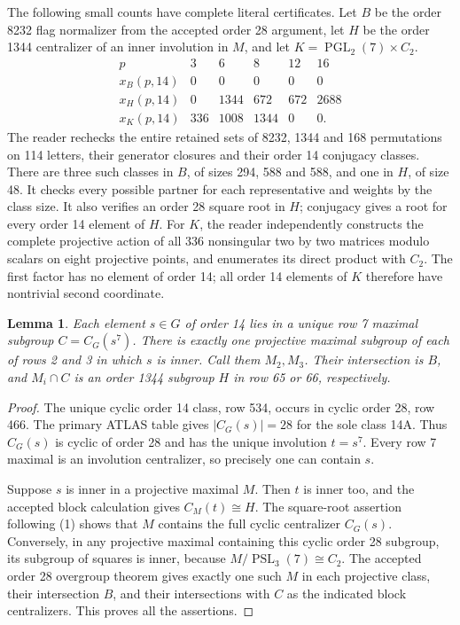 \documentclass[11pt,a4paper]{article}
\newtheorem{lemma}{Lemma}\newtheorem{theorem}{Theorem}
\begin{document}
The following small counts have complete literal certificates.
Let $B$ be the order 8232 flag normalizer from the accepted order 28
argument, let $H$ be the order 1344 centralizer of an inner involution
in $M$, and let $K=\operatorname{PGL}_2(7)\times C_2$.
\[
\begin{array}{c|rrrrr}
p&3&6&8&12&16\\\hline
x_B(p,14)&0&0&0&0&0\\
x_H(p,14)&0&1344&672&672&2688\\
x_K(p,14)&336&1008&1344&0&0.
\end{array}                                                    \tag{1}
\]
The reader rechecks the entire retained sets of 8232, 1344 and 168
permutations on 114 letters, their generator closures and their
order 14 conjugacy classes. There are three such classes in $B$,
of sizes 294, 588 and 588, and one in $H$, of size 48. It checks
every possible partner for each representative and weights by the
class size. It also verifies an order 28 square root in $H$;
conjugacy gives a root for every order 14 element of $H$.
For $K$, the reader independently constructs the complete projective
action of all 336 nonsingular two by two matrices modulo scalars
on eight projective points, and enumerates its direct product with
$C_2$. The first factor has no element of order 14; all order 14
elements of $K$ therefore have nontrivial second coordinate.

\begin{lemma}\label{inner}
Each element $s\in G$ of order 14 lies in a unique row 7 maximal
subgroup $C=C_G(s^7)$. There is exactly one projective maximal
subgroup of each of rows 2 and 3 in which $s$ is inner. Call them
$M_2,M_3$. Their intersection is $B$, and
$M_i\cap C$ is an order 1344 subgroup $H$ in row 65 or 66,
respectively.
\end{lemma}
\begin{proof}
The unique cyclic order 14 class, row 534, occurs in cyclic order
28, row 466. The primary ATLAS table gives $|C_G(s)|=28$ for the
sole class 14A. Thus $C_G(s)$ is cyclic of order 28 and has the
unique involution $t=s^7$. Every row 7 maximal is an involution
centralizer, so precisely one can contain $s$.

Suppose $s$ is inner in a projective maximal $M$. Then $t$ is
inner too, and the accepted block calculation gives
$C_M(t)\cong H$. The square-root assertion following (1) shows
that $M$ contains the full cyclic centralizer $C_G(s)$.
Conversely, in any projective maximal containing this cyclic
order 28 subgroup, its subgroup of squares is inner, because
$M/\operatorname{PSL}_3(7)\cong C_2$. The accepted order 28
overgroup theorem gives exactly one such $M$ in each projective
class, their intersection $B$, and their intersections with $C$
as the indicated block centralizers. This proves all the assertions.
\end{proof}
\end{document}
